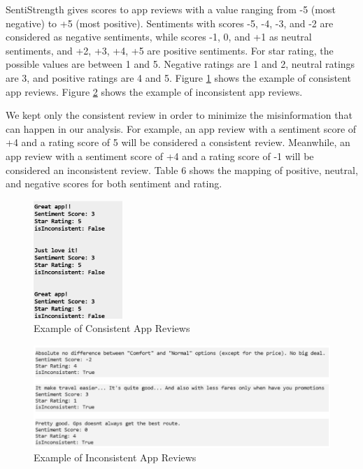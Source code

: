 \documentclass[12pt]{article}
\begin{document}
SentiStrength gives scores to app reviews with a value ranging from -5 (most negative) to +5 (most positive). Sentiments with scores -5, -4, -3, and -2 are considered as negative sentiments, while scores -1, 0, and +1 as neutral sentiments, and +2, +3, +4, +5 are positive sentiments. For star rating, the possible values are between 1 and 5. Negative ratings are 1 and 2, neutral ratings are 3, and positive ratings are 4 and 5. Figure \ref{fig:example_of_consistent} shows the example of consistent app reviews. Figure \ref{fig:example_of_inconsistent} shows the example of inconsistent app reviews.

We kept only the consistent review in order to minimize the misinformation that can happen in our analysis. For example, an app review with a sentiment score of +4 and a rating score of 5 will be considered a consistent review. Meanwhile, an app review with a sentiment score of +4 and a rating score of -1 will be considered an inconsistent review. Table 6 shows the mapping of positive, neutral, and negative scores for both sentiment and rating.

\begin{figure}[!h]
\begin{center}
\includegraphics[width=0.3\textwidth]{figures/example_consistent_review.png}
\caption{Example of Consistent App Reviews}
\label{fig:example_of_consistent}
\end{center}
\end{figure}

\begin{figure}[h]
\begin{center}
\includegraphics[width=1\textwidth]{figures/example_inconsistent_review.png}
\caption{Example of Inconsistent App Reviews}
\label{fig:example_of_inconsistent}
\end{center}
\end{figure}
\end{document}
